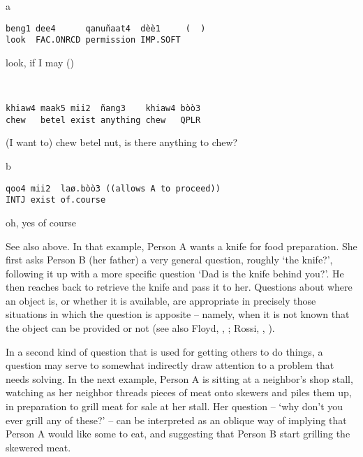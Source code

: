 \documentclass[output=paper]{langsci/langscibook}
\begin{document}
\vspace{-1mm}
%
\begin{mdframednoverticalspace}[style=firstfoc]
\begin{transbox}{1}{a}
\begin{verbatim}
beng1 dee4      qanuñaat4  dèè1     (  )
look  FAC.ONRCD permission IMP.SOFT
\end{verbatim}
look, if I may (\hspace{0.3cm})
\end{transbox}
\end{mdframednoverticalspace}
%
\begin{mdframednoverticalspace}[style=firstfoc]
\begin{transbox}{2}{~}
\begin{verbatim}
khiaw4 maak5 mii2  ñang3    khiaw4 bòò3
chew   betel exist anything chew   QPLR
\end{verbatim}
(I want to) chew betel nut, is there anything to chew?
\end{transbox}
\end{mdframednoverticalspace}
%
\vspace{-1mm}
%
\begin{mdframednoverticalspace}[style=secondfoc]
\begin{transbox}{2}{b}
\begin{verbatim}
qoo4 mii2  laø.bòò3 ((allows A to proceed))
INTJ exist of.course
\end{verbatim}
oh, yes of course
\end{transbox}
\end{mdframednoverticalspace}\bigskip

See also  above. In that example, Person A wants a knife for food preparation. She first asks Person B (her father) a very general question, roughly ‘the knife?’, following it up with a more specific question ‘Dad is the knife behind you?’. He then reaches back to retrieve the knife and pass it to her. Questions about where an object is, or whether it is available, are appropriate in precisely those situations in which the question is apposite -- namely, when it is not known that the object can be provided or not (see also Floyd, , ; Rossi, , ). %

In a second kind of question that is used for getting others to do things, a question may serve to somewhat indirectly draw attention to a problem that needs solving. In the next example, Person A is sitting at a neighbor’s shop stall, watching as her neighbor threads pieces of meat onto skewers and piles them up, in preparation to grill meat for sale at her stall. Her question -- ‘why don’t you ever grill any of these?’ -- can be interpreted as an oblique way of implying that Person A would like some to eat, and suggesting that Person B start grilling the skewered meat.
\end{document}
